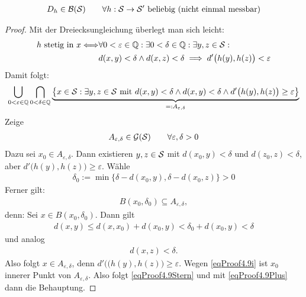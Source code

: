 \begin{lemma}\label{lemma4.9}
\begin{align*}
D_h\in\B(\S)\qquad\forall h:\S\to\S'\text{ beliebig (nicht einmal messbar)}
\end{align*}
\end{lemma}
\begin{proof}
Mit der Dreiecksungleichung überlegt man sich leicht:
\begin{align*}
h\text{ stetig in }x
\Longleftrightarrow
&\forall 0<\varepsilon\in\Q:\exists 0<\delta\in\Q:\exists y,z\in\S:\\
&d(x,y)<\delta\wedge d(x,z)<\delta
\implies d'\big(h(y),h(z)\big)<\varepsilon
\end{align*}
Damit folgt:
\begin{align}\label{eqProof4.9Plus}
\bigcup\limits_{0<\varepsilon\in\Q}\bigcap\limits_{0<\delta\in\Q}\underbrace{\big\lbrace x\in\S:\exists y,z\in\S\mit d(x,y)<\delta\wedge d(x,y)<\delta\wedge d'\big(h(y),h(z)\big)\geq\varepsilon\big\rbrace}_{=:A_{\varepsilon,\delta}}
\end{align}
Zeige 
\begin{align}\label{eqProof4.9Stern}
A_{\varepsilon,\delta}\in\G(\S)\qquad\forall\varepsilon,\delta>0
\end{align}
Dazu sei $x_0\in A_{\varepsilon,\delta}$. Dann existieren $y,z\in\S$ mit $d(x_0,y)<\delta$ und $d(z_0,z)<\delta$, aber $d'\big(h(y),h(z)\big)\geq\varepsilon$. Wähle
\begin{align*}
\delta_0:=\min\big\lbrace\delta- d(x_0,y),\delta-d(x_0,z)\big\rbrace>0
\end{align*}
Ferner gilt:
\begin{align}\label{eqProof4.9i}
B(x_0,\delta_0)\subseteq A_{\varepsilon,\delta},
\end{align}
denn: Sei $x\in B(x_0,\delta_0)$. Dann gilt
\begin{align*}
d(x,y)\leq d(x,x_0)+d(x_0,y)<\delta_0+d(x_0,y)<\delta
\end{align*}
und analog
\begin{align*}
d(x,z)<\delta.
\end{align*}
Also folgt $x\in A_{\varepsilon,\delta}$, denn $d'\big((h(y),h(z)\big)\geq\varepsilon$. Wegen \eqref{eqProof4.9i} ist $x_0$ innerer Punkt von $A_{\varepsilon,\delta}$. Also folgt \eqref{eqProof4.9Stern} und mit \eqref{eqProof4.9Plus} dann die Behauptung.
\end{proof}



